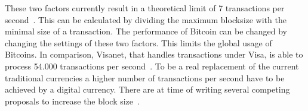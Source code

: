 These two factors currently result in a theoretical limit of 7 transactions per second~\cite{bitcoin-transactions}.
This can be calculated by dividing the maximum blocksize with the minimal size of a transaction.
The performance of Bitcoin can be changed by changing the settings of these two factors.
This limits the global usage of Bitcoins.
In comparison, Visanet, that handles transactions under Visa,
is able to process 54.000 transactions per second~\cite{visa-transactions}.
To be a real replacement of the current traditional currencies
a higher number of transactions per second have to be achieved by a digital currency.
There are at time of writing several competing proposals to increase the block size~\cite{garzik-blocksize,andresen-blocksize}.

